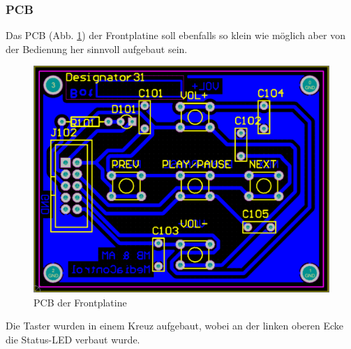 \subsubsection{PCB} \label{subsubsec:4.1.10.3}
Das PCB (Abb. \ref {fig:4.1.10.3.1}) der Frontplatine soll ebenfalls so klein wie möglich aber von der Bedienung her sinnvoll aufgebaut sein.
\begin{figure} [H]
	\centering
	\includegraphics[width=1\textwidth]{img/BTModul/front_pcb.png}
	\caption{PCB der Frontplatine}\label {fig:4.1.10.3.1}
\end{figure}
Die Taster wurden in einem Kreuz aufgebaut, wobei an der linken oberen Ecke die Status-LED verbaut wurde.







